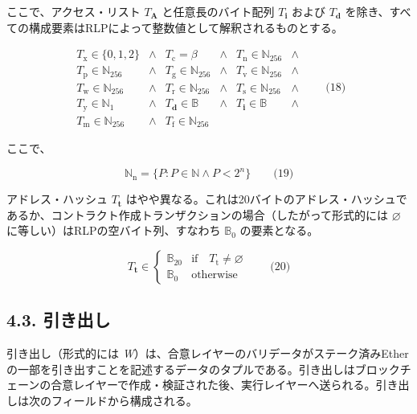 \documentclass[
]{ltjsarticle}
\begin{document}
ここで、アクセス・リスト \(T_{\mathbf{A}}\) と任意長のバイト配列
\(T_{\mathbf{i}}\) および \(T_{\mathbf{d}}\)
を除き、すべての構成要素はRLPによって整数値として解釈されるものとする。

\protect\hypertarget{eq-18}{}{}

\[\begin{array}{lclclc}
T_{\mathrm{x}} \in \{0, 1, 2\} & \wedge & T_{\mathrm{c}} = \beta & \wedge & T_{\mathrm{n}} \in \mathbb{N}_{256} & \wedge \\
T_{\mathrm{p}} \in \mathbb{N}_{256} & \wedge & T_{\mathrm{g}} \in \mathbb{N}_{256} & \wedge & T_{\mathrm{v}} \in \mathbb{N}_{256} & \wedge \\
T_{\mathrm{w}} \in \mathbb{N}_{256} & \wedge & T_{\mathrm{r}} \in \mathbb{N}_{256} & \wedge & T_{\mathrm{s}} \in \mathbb{N}_{256} & \wedge \\
T_{\mathrm{y}} \in \mathbb{N}_{1} & \wedge & T_{\mathbf{d}} \in \mathbb{B} & \wedge & T_{\mathbf{i}} \in \mathbb{B} & \wedge \\
T_{\mathrm{m}} \in \mathbb{N}_{256} & \wedge & T_{\mathrm{f}} \in \mathbb{N}_{256}
\end{array} \qquad \text{(18)}\]

ここで、

\protect\hypertarget{eq-19}{}{}

\[\mathbb{N}_{\mathrm{n}} = \{ P: P \in \mathbb{N} \wedge P < 2^n \} \qquad \text{(19)}\]

アドレス・ハッシュ \(T_{\mathbf{t}}\)
はやや異なる。これは20バイトのアドレス・ハッシュであるか、コントラクト作成トランザクションの場合（したがって形式的には
\(\varnothing\) に等しい）はRLPの空バイト列、すなわち \(\mathbb{B}_0\)
の要素となる。

\protect\hypertarget{eq-20}{}{}

\[T_{\mathbf{t}} \in \begin{cases} \mathbb{B}_{20} & \text{if} \quad T_{\mathrm{t}} \neq \varnothing \\
\mathbb{B}_{0} & \text{otherwise}\end{cases} \qquad \text{(20)}\]

\protect\hypertarget{subsec:The_Withdrawal}{}{}

\hypertarget{ux5f15ux304dux51faux3057}{%
\subsection{4.3. 引き出し}\label{ux5f15ux304dux51faux3057}}

引き出し（形式的には
\emph{W}）は、合意レイヤーのバリデータがステーク済みEtherの一部を引き出すことを記述するデータのタプルである。引き出しはブロックチェーンの合意レイヤーで作成・検証された後、実行レイヤーへ送られる。引き出しは次のフィールドから構成される。
\end{document}
